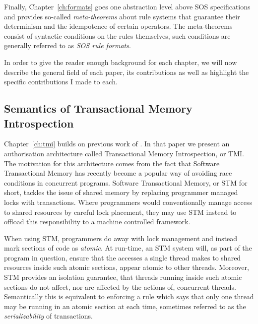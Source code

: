 Finally, Chapter~\ref{ch:formats} goes one abstraction level above SOS specifications
and provides so-called \emph{meta-theorems} about rule systems that guarantee their
determinism and the idempotence of certain operators. The meta-theorems consist of
syntactic conditions on the rules themselves, such conditions are generally referred
to as \emph{SOS rule formats}.

In order to give the reader enough background for each chapter, we will now describe
the general field of each paper, its contributions as well as highlight the specific
contributions I made to each.

\subsection{Semantics of Transactional Memory Introspection} %

Chapter~\ref{ch:tmi} builds on previous work of \cite{tmi}. In that paper we present
an authorisation architecture called Transactional Memory Introspection, or TMI.
The motivation for this architecture comes from the fact that Software Transactional
Memory has recently become a popular way of avoiding race conditions in concurrent
programs. Software Transactional Memory, or STM for short, tackles the issue of
shared memory by replacing programmer managed locks with transactions. Where programmers
would conventionally manage access to shared resources by careful lock placement,
they may use STM instead to offload this responsibility to a machine controlled
framework.

When using STM, programmers do away with lock management and instead mark sections
of code as \emph{atomic}. At run-time, an STM system will, as part of the program
in question, ensure that the accesses a single thread makes to shared resources
inside such atomic sections, appear atomic to other threads. Moreover, 
STM provides an isolation guarantee, that threads running inside such atomic sections
do not affect, nor are affected by the actions of, concurrent threads.
Semantically this is equivalent to enforcing a rule which says that only
one thread may be running in an atomic section at each time, sometimes referred
to as the {\em serializability} of transactions.

